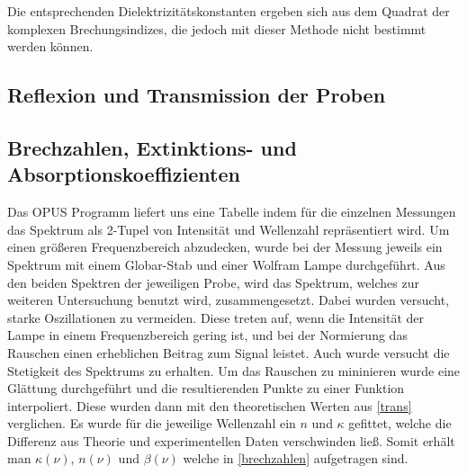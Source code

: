 \documentclass[paper=a4,fontsize=10pt,DIV=18,twocolumn,parskip=half]{scrartcl}
\numberwithin{equation}{section}    %
\begin{document}
Die entsprechenden Dielektrizitätskonstanten ergeben sich aus dem Quadrat der 
komplexen Brechungsindizes, die jedoch mit dieser Methode nicht bestimmt werden können.

\subsection{Reflexion und Transmission der Proben}

\subsection{Brechzahlen, Extinktions- und Absorptionskoeffizienten}

Das OPUS Programm liefert uns eine Tabelle indem für die einzelnen Messungen das 
Spektrum als 2-Tupel von Intensität und Wellenzahl repräsentiert wird. Um einen 
größeren Frequenzbereich abzudecken, wurde bei der Messung jeweils ein Spektrum 
mit einem Globar-Stab und einer Wolfram Lampe durchgeführt. Aus den beiden 
Spektren der jeweiligen Probe, wird das Spektrum, welches zur weiteren 
Untersuchung benutzt wird, zusammengesetzt. Dabei wurden versucht, starke 
Oszillationen zu vermeiden. Diese treten auf, wenn die Intensität der Lampe in 
einem Frequenzbereich gering ist, und bei der Normierung das Rauschen einen 
erheblichen Beitrag zum Signal leistet. Auch wurde versucht die Stetigkeit des 
Spektrums zu erhalten. Um das Rauschen zu mininieren wurde eine Glättung 
durchgeführt und die resultierenden Punkte zu einer Funktion interpoliert. Diese 
wurden dann mit den theoretischen Werten aus \cref{trans} verglichen. Es wurde 
für die jeweilige Wellenzahl ein $n$ und $\kappa$ gefittet, welche die Differenz 
aus Theorie und experimentellen Daten verschwinden ließ. Somit erhält man 
$\kappa(\nu)$, $n(\nu)$ und $\beta(\nu)$ welche in \cref{brechzahlen} 
aufgetragen sind. 
\end{document}

